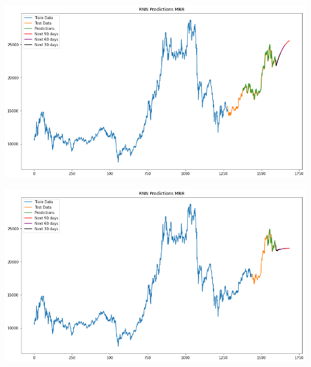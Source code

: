 \documentclass[conference]{IEEEtran}
\begin{document}
\begin{minipage}{0.23\textwidth}
    \centering
    \includegraphics[width=\linewidth]{images/RNN/RNN_MBB_82.png}
    \label{fig:image1}
\end{minipage}
\hfill
\begin{minipage}{0.23\textwidth}
    \centering
    \includegraphics[width=\linewidth]{images/RNN/RNN_MBB_91.png}
    \label{fig:image2}
\end{minipage}
\end{document}
